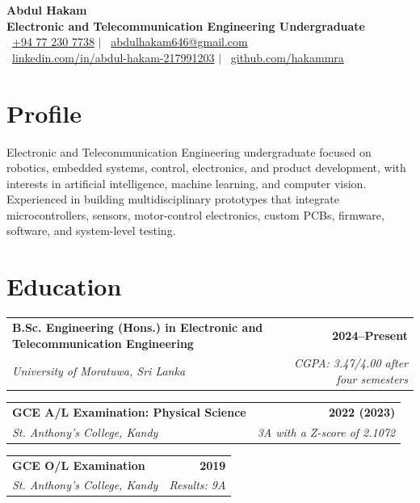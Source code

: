 \documentclass[a4paper,10pt]{article}
\makeatletter
\newcommand{\educationEntry}[4]{%
  \begin{tabularx}{\textwidth}{@{}Xr@{}}
    \textbf{#1} & \textbf{\small #2} \\
    \textit{#3} & \textit{\small #4}
  \end{tabularx}
}
\makeatother
\begin{document}
\fontsize{9.5}{11.25}\selectfont

\begin{center}
  {\LARGE\bfseries Abdul Hakam}\\[0.75mm]
  {\large\bfseries Electronic and Telecommunication Engineering Undergraduate}\\[1.5mm]

  \small
  \faPhone\ \href{tel:+94772307738}{+94 77 230 7738}
  \quad $\vert$ \quad
  \faEnvelope\ \href{mailto:abdulhakam646@gmail.com}{abdulhakam646@gmail.com}\\[0.8mm]

  \faLinkedin\ 
  \href{https://www.linkedin.com/in/abdul-hakam-217991203}
  {linkedin.com/in/abdul-hakam-217991203}
  \quad $\vert$ \quad
  \faGithub\ 
  \href{https://github.com/hakammra}
  {github.com/hakammra}
\end{center}

\vspace{-1.2mm}

\section{Profile}
Electronic and Telecommunication Engineering undergraduate focused on robotics, embedded systems, control, electronics, and product development, with interests in artificial intelligence, machine learning, and computer vision. Experienced in building multidisciplinary prototypes that integrate microcontrollers, sensors, motor-control electronics, custom PCBs, firmware, software, and system-level testing.
\section{Education}
\educationEntry
  {B.Sc. Engineering (Hons.) in Electronic and Telecommunication Engineering}
  {2024--Present}
  {University of Moratuwa, Sri Lanka}
  {CGPA: 3.47/4.00 after four semesters}

\vspace{1.35mm}
\educationEntry
  {GCE A/L Examination: Physical Science}
  {2022 (2023)}
  {St. Anthony's College, Kandy}
  {3A with a Z-score of 2.1072}

\vspace{1.35mm}
\educationEntry
  {GCE O/L Examination}
  {2019}
  {St. Anthony's College, Kandy}
  {Results: 9A}
\end{document}
